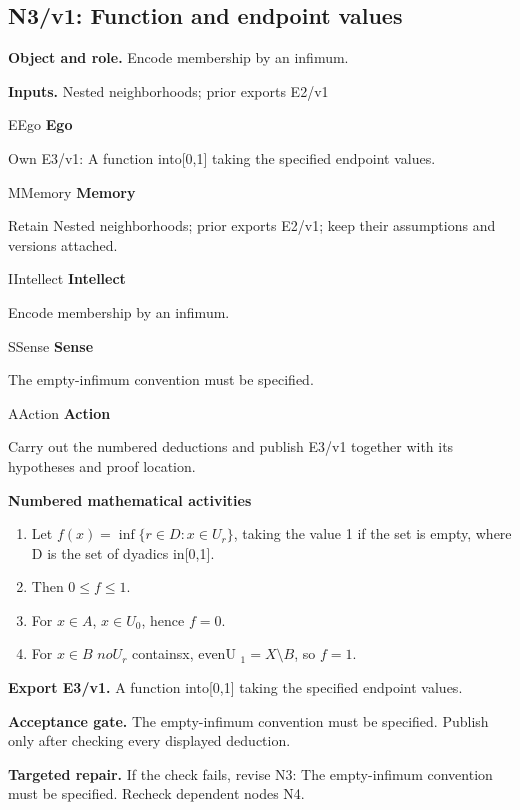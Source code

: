 \documentclass[preprint,12pt,aps,pra,showkeys,amsmath,amssymb,superscriptaddress,floatfix]{revtex4-2}
\theoremstyle{definition}
\theoremstyle{remark}
\newcommand{\mmfaculty}[3]{%
 \begin{mmfacultybox}{#1}{#2}
 {\sffamily\bfseries\color{MMBlue}#2}\par\smallskip #3
 \end{mmfacultybox}}
\newcommand{\field}[2]{\par\smallskip\noindent\textbf{#1.} #2\par}
\begin{document}
\clearpage

\subsection{N3/v1: Function and endpoint values}

\field{Object and role}{Encode membership by an infimum.}

\field{Inputs}{Nested neighborhoods; prior exports E2/v1}

\mmfaculty{E}{Ego}{Own E3/v1: A function into{[}0,1{]} taking the specified endpoint
values.}

\mmfaculty{M}{Memory}{Retain Nested neighborhoods; prior exports E2/v1; keep their assumptions
and versions attached.}

\mmfaculty{I}{Intellect}{Encode membership by an infimum.}

\mmfaculty{S}{Sense}{The empty-infimum convention must be specified.}

\mmfaculty{A}{Action}{Carry out the numbered deductions and publish E3/v1 together with its
hypotheses and proof location.}

\smallskip\noindent\textbf{Numbered mathematical activities}

\begin{enumerate}[label=N3.\arabic*,leftmargin=3.4em]

\item Let \(f(x)=\operatorname{inf} \{r\in D:x\in U_r\}\), taking the value 1
if the set is empty, where D is the set of dyadics in{[}0,1{]}.

\item Then \(0\le f\le 1\).

\item For \(x\in A\), \(x\in U_{0}\), hence \(f=0\).

\item For \(x\in B\) \(noU_r\) containsx, evenU \(_{1}=X\setminus B\), so
\(f=1\).

\end{enumerate}

\field{Export E3/v1}{A function into{[}0,1{]} taking the specified endpoint values.}

\field{Acceptance gate}{The empty-infimum convention must be specified. Publish only after
checking every displayed deduction.}

\field{Targeted repair}{If the check fails, revise N3: The empty-infimum convention must be
specified. Recheck dependent nodes N4.}
\end{document}
